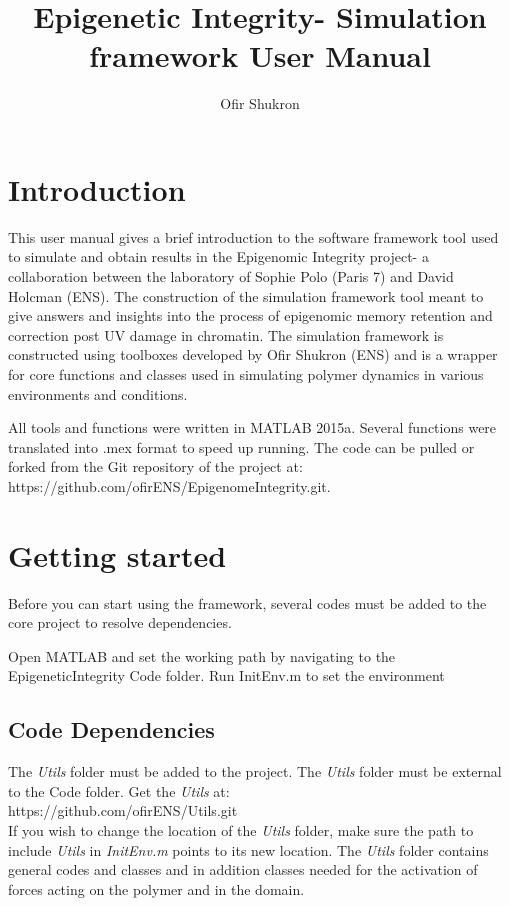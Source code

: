\documentclass[12pt]{article}
\begin{document}
	\title{Epigenetic Integrity- Simulation framework User Manual}
	\maketitle
	\author{Ofir Shukron}
	\section{Introduction}
	This user manual gives a brief introduction to the software framework tool used to simulate and obtain results in the Epigenomic Integrity project- a collaboration between the laboratory of Sophie Polo (Paris 7) and David Holcman (ENS).
	The construction of the simulation framework tool meant to give answers and insights into the process of epigenomic memory retention and correction post UV damage in chromatin. The simulation framework is constructed using toolboxes developed by Ofir Shukron (ENS) and is a wrapper for core functions and classes used in simulating polymer dynamics in various environments and conditions.
	
	All tools and functions were written in MATLAB 2015a. Several functions were translated into .mex format to speed up running. 
	The code can be pulled or forked from the Git repository of the project at:\\ https://github.com/ofirENS/EpigenomeIntegrity.git. \\
	
	\section{Getting started}
	Before you can start using the framework, several codes must be added to the core project to resolve dependencies.
	
    Open MATLAB and set the working path by navigating to the EpigeneticIntegrity Code folder. Run InitEnv.m to set the environment
	\subsection{Code Dependencies}
	The \textit{Utils} folder must be added to the project. The \textit{Utils} folder must be external to the Code folder.
	Get the \textit{Utils} at:\\
	 https://github.com/ofirENS/Utils.git\\
	If you wish to change the location of the \textit{Utils} folder, make sure the path to include \textit{Utils} in \textit{InitEnv.m} points to its new location.
	The \textit{Utils} folder contains general codes and classes and in addition classes needed for the activation of forces acting on the polymer and in the domain. 
	
\end{document}
